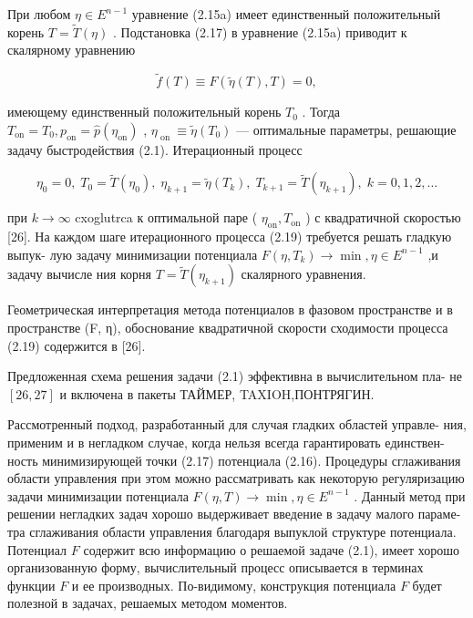 \documentclass[10pt]{article}
\begin{document}
При любом \(\eta  \in  {E}^{n - 1}\) уравнение (2.15a) имеет единственный положительный корень \(T = \widetilde{T}\left( \eta \right)\) . Подстановка (2.17) в уравнение (2.15a) приводит к скалярному уравнению

\[
\widetilde{f}\left( T\right)  \equiv  F\left( {\widetilde{\eta }\left( T\right) ,T}\right)  = 0, \tag{2.18}
\]

имеющему единственный положительный корень \({T}_{0}\) . Тогда \({T}_{\mathrm{{on}}} = {T}_{0},{p}_{\mathrm{{on}}} = \widehat{p}\left( {\eta }_{\mathrm{{on}}}\right)\) , \({\eta }_{\text{ on }} \equiv  \widetilde{\eta }\left( {T}_{0}\right)\) — оптимальные параметры, решающие задачу быстродействия (2.1). Итерационный процесс

\[
{\eta }_{0} = 0,\;{T}_{0} = \widetilde{T}\left( {\eta }_{0}\right) ,\;{\eta }_{k + 1} = \widetilde{\eta }\left( {T}_{k}\right) ,\;{T}_{k + 1} = \widetilde{T}\left( {\eta }_{k + 1}\right) ,\;k = 0,1,2,\ldots \tag{2.19}
\]

при \(k \rightarrow  \infty\) cxoglutrca к оптимальной паре ( \({\eta }_{\mathrm{{on}}},{T}_{\mathrm{{on}}}\) ) с квадратичной скоростью [26]. На каждом шаге итерационного процесса (2.19) требуется решать гладкую выпук- лую задачу минимизации потенциала \(F\left( {\eta ,{T}_{k}}\right)  \rightarrow  \min ,\eta  \in  {E}^{n - 1}\) ,и задачу вычисле ния корня \(T = \widetilde{T}\left( {\eta }_{k + 1}\right)\) скалярного уравнения.

Геометрическая интерпретация метода потенциалов в фазовом пространстве и в пространстве (F, η), обоснование квадратичной скорости сходимости процесса (2.19) содержится в [26].

Предложенная схема решения задачи (2.1) эффективна в вычислительном пла- не \(\left[  {{26},{27}}\right]\) и включена в пакеты ТАЙМЕР, TAXIOH,ПОНТРЯГИН.

Рассмотренный подход, разработанный для случая гладких областей управле- ния, применим и в негладком случае, когда нельзя всегда гарантировать единствен- ность минимизирующей точки (2.17) потенциала (2.16). Процедуры сглаживания области управления при этом можно рассматривать как некоторую регуляризацию задачи минимизации потенциала \(F\left( {\eta ,T}\right)  \rightarrow  \min ,\eta  \in  {E}^{n - 1}\) . Данный метод при решении негладких задач хорошо выдерживает введение в задачу малого параме- тра сглаживания области управления благодаря выпуклой структуре потенциала. Потенциал \(F\) содержит всю информацию о решаемой задаче (2.1), имеет хорошо организованную форму, вычислительный процесс описывается в терминах функции \(F\) и ее производных. По-видимому, конструкция потенциала \(F\) будет полезной в задачах, решаемых методом моментов.
\end{document}
